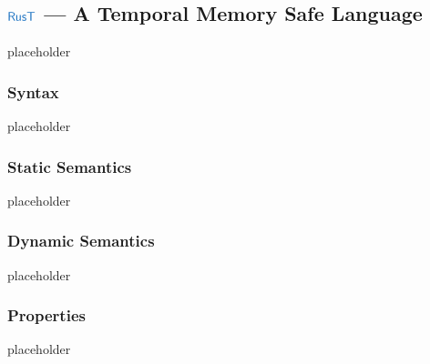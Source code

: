 \subsection{$\src{RusT}$ --- A Temporal Memory Safe Language}\label{subsec-rust}
placeholder
\subsubsection{Syntax}\label{subsec-rust-syntax}
placeholder
\subsubsection{Static Semantics}\label{subsec-rust-static}
placeholder
\subsubsection{Dynamic Semantics}\label{subsec-rust-dynamic}
placeholder
\subsubsection{Properties}\label{subsec-rust-properties}
placeholder

